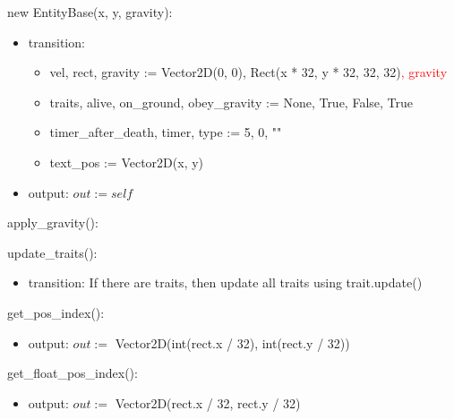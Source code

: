 \documentclass[12pt]{article}
\begin{document}
new EntityBase(x, y, gravity):
\begin{itemize}
    \item transition: 
    \begin{itemize}[]
        \item vel, rect, gravity := Vector2D(0, 0), Rect(x * 32, y * 32, 32, 32)\textcolor{red}{, gravity}
        \item traits, alive, on\_ground, obey\_gravity := None, True, False, True
        \item timer\_after\_death, timer, type := 5, 0, ""
        \item \color{red}text\_pos := Vector2D(x, y)
    \end{itemize}
    \item output: $out := self$
\end{itemize}

\noindent apply\_gravity():

\noindent update\_traits():
\begin{itemize}
    \item transition: If there are traits, then update all traits using trait.update()
\end{itemize}

\noindent get\_pos\_index():
\begin{itemize}
    \item output: $out := $ Vector2D(int(rect.x / 32), int(rect.y / 32))
\end{itemize}

\noindent get\_float\_pos\_index():
\begin{itemize}
    \item output: $out := $ Vector2D(rect.x / 32, rect.y / 32)
\end{itemize}
\end{document}
